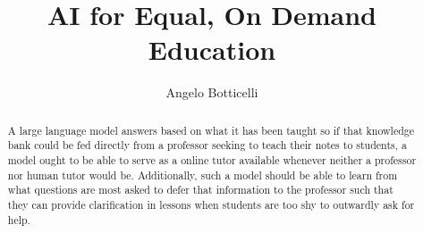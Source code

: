 \documentclass[sigconf,natbib=false]{acmart}
\begin{document}
\title{AI for Equal, On Demand Education}


\author{Angelo Botticelli}
\renewcommand{\shortauthors}{Botticelli.}

\begin{abstract}
  A large language model answers based on what it has been taught so if that knowledge bank could be fed directly from a professor seeking to teach their notes to students, a model ought to be able to serve as a online tutor available whenever neither a professor nor human tutor would be. Additionally, such a model should be able to learn from what questions are most asked to defer that information to the professor such that they can provide clarification in lessons when students are too shy to outwardly ask for help.
\end{abstract}
\end{document}
